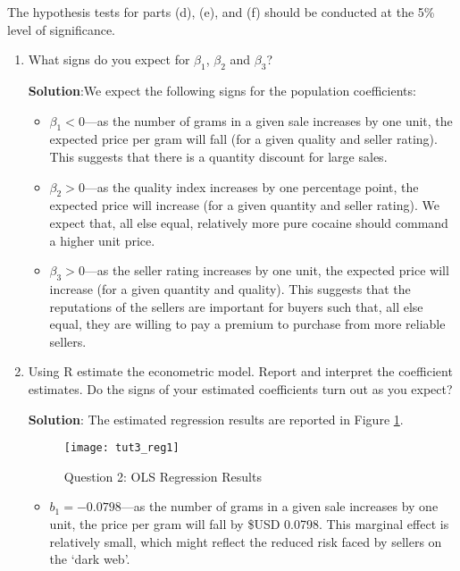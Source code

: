 \documentclass[12pt,a4paper]{article}
\begin{document}
\noindent The hypothesis tests for parts (d), (e), and (f) should be conducted at the 5\% level of significance.
\begin{enumerate}
\item What signs do you expect for $\beta_{1}$, $\beta_{2}$ and
$\beta_{3}$? \vspace{0.1in}

\noindent \textbf{Solution}:We expect the following signs for the
population coefficients:
\begin{itemize}
\item $\beta_{1} < 0$---as the number of grams in a given sale increases by one unit, the
expected price per gram will fall (for a given quality and seller rating). This suggests that
there is a quantity discount for large sales.

\item $\beta_{2}  > 0$---as the quality index increases by one percentage point, the expected price will
increase (for a given quantity and seller rating). We expect that, all else equal,
relatively more pure cocaine should command a higher unit price.

\item $\beta_{3} > 0$---as the seller rating increases by one unit, the expected price will increase (for a given
quantity and quality). This suggests that the reputations of the sellers are important for buyers such that, all else equal,  they are
willing to pay a premium to purchase from more reliable sellers.
\end{itemize}
\item Using \textsc{R} estimate the econometric model. Report
and interpret the coefficient estimates. Do the signs of your
estimated coefficients turn out as you expect? \vspace {0.1in}

\noindent \textbf{Solution}: The estimated regression results are
reported in Figure \ref{Fi:quest2}.
\begin{figure}
\begin{center}
\setlength{\unitlength}{1mm}
\texttt{[image: tut3\_reg1]}
\end{center}
\caption{Question 2: OLS Regression Results} \label{Fi:quest2}
\end{figure}
\begin{itemize}
\item $b_{1}  = -0.0798$---as the number of grams in a given sale increases by one
unit, the price per gram will fall by \$USD 0.0798. This marginal effect is relatively small, which might reflect the
reduced risk faced by sellers on the `dark web'.


\end{itemize}
\end{enumerate}
\end{document}
